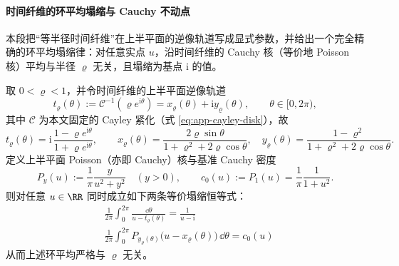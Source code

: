 \paragraph{时间纤维的环平均塌缩与 Cauchy 不动点}\label{par:xi-timefiber-poisson-collapse-cauchy-fixedpoint}
本段把“等半径时间纤维”在上半平面的逆像轨道写成显式参数，并给出一个完全精确的环平均塌缩律：对任意实点 \(u\)，沿时间纤维的 Cauchy 核（等价地 Poisson 核）平均与半径 \(\varrho\) 无关，且塌缩为基点 \(\mathrm{i}\) 的值。

\begin{proposition}\label{prop:xi-cayley-timefiber-poisson-collapse}
取 \(0<\varrho<1\)，并令时间纤维的上半平面逆像轨道
\[
t_{\varrho}(\theta):=\mathcal{C}^{-1}(\varrho e^{\mathrm{i}\theta})
=x_{\varrho}(\theta)+\mathrm{i}y_{\varrho}(\theta),
\qquad \theta\in[0,2\pi),
\]
其中 \(\mathcal{C}\) 为本文固定的 Cayley 紧化（式 \eqref{eq:app-cayley-disk}），故
\[
t_{\varrho}(\theta)=\mathrm{i}\,\frac{1-\varrho e^{\mathrm{i}\theta}}{1+\varrho e^{\mathrm{i}\theta}},
\qquad
x_{\varrho}(\theta)=\frac{2\varrho\sin\theta}{1+\varrho^2+2\varrho\cos\theta},\quad
y_{\varrho}(\theta)=\frac{1-\varrho^2}{1+\varrho^2+2\varrho\cos\theta}.
\]
定义上半平面 Poisson（亦即 Cauchy）核与基准 Cauchy 密度
\[
P_y(u):=\frac{1}{\pi}\frac{y}{u^2+y^2}\quad(y>0),\qquad
c_0(u):=P_1(u)=\frac{1}{\pi}\frac{1}{1+u^2}.
\]
则对任意 \(u\in\RR\) 同时成立如下两条等价塌缩恒等式：
\begin{align}
&\boxed{\;
\frac{1}{2\pi}\int_{0}^{2\pi}\frac{\dd\theta}{u-t_{\varrho}(\theta)}
=\frac{1}{u-\mathrm{i}}\;}\label{eq:xi-timefiber-stieltjes-cauchy-collapse}\\[2mm]
&\boxed{\;
\frac{1}{2\pi}\int_{0}^{2\pi}P_{y_{\varrho}(\theta)}\!\bigl(u-x_{\varrho}(\theta)\bigr)\,\dd\theta
=c_0(u)\;}\label{eq:xi-timefiber-poisson-ring-collapse}
\end{align}
从而上述环平均严格与 \(\varrho\) 无关。
\end{proposition}

